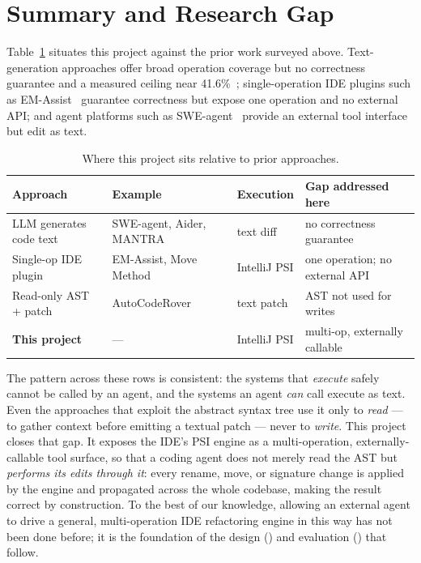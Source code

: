 \section{Summary and Research Gap}
\label{sec:bg-gap}

Table~\ref{tab:gap} situates this project against the prior work surveyed above.
Text-generation approaches offer broad operation coverage but no correctness
guarantee and a measured ceiling near 41.6\%~\citep{swerefactor2025};
single-operation IDE plugins such as EM-Assist~\citep{emassist2024} guarantee
correctness but expose one operation and no external API; and agent platforms
such as SWE-agent~\citep{sweagent2024} provide an external tool interface but
edit as text.

\begin{table}[h]
\centering
\caption{Where this project sits relative to prior approaches.}
\label{tab:gap}
\begin{tabular}{@{}llll@{}}
\toprule
Approach & Example & Execution & Gap addressed here \\
\midrule
LLM generates code text   & SWE-agent, Aider, MANTRA & text diff      & no correctness guarantee \\
Single-op IDE plugin      & EM-Assist, Move Method   & IntelliJ PSI    & one operation; no external API \\
Read-only AST + patch     & AutoCodeRover            & text patch      & AST not used for writes \\
\textbf{This project}     & ---                      & IntelliJ PSI    & multi-op, externally callable \\
\bottomrule
\end{tabular}
\end{table}

The pattern across these rows is consistent: the systems that \emph{execute} safely
cannot be called by an agent, and the systems an agent \emph{can} call execute as
text. Even the approaches that exploit the abstract syntax tree use it only to
\emph{read} --- to gather context before emitting a textual patch --- never to
\emph{write}. This project closes that gap. It exposes the IDE's PSI engine as a
multi-operation, externally-callable tool surface, so that a coding agent does not
merely read the AST but \emph{performs its edits through it}: every rename, move, or
signature change is applied by the engine and propagated across the whole codebase,
making the result correct by construction. To the best of our knowledge, allowing an
external agent to drive a general, multi-operation IDE refactoring engine in this way
has not been done before; it is the foundation of the design () and
evaluation () that follow.
